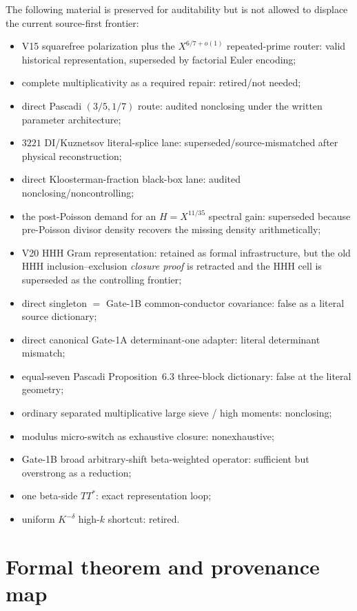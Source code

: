 \documentclass[11pt]{article}
\theoremstyle{definition}
\newcommand{\1}{\mathbf 1}
\begin{document}
The following material is preserved for auditability but is not allowed to displace the
current source-first frontier:
\begin{itemize}[leftmargin=1.6em]
\item V15 squarefree polarization plus the $X^{6/7+o(1)}$ repeated-prime router:
  valid historical representation, superseded by factorial Euler encoding;
\item complete multiplicativity as a required repair: retired/not needed;
\item direct Pascadi $(3/5,1/7)$ route: audited nonclosing under the written parameter
  architecture;
\item $3221$ DI/Kuznetsov literal-splice lane: superseded/source-mismatched after physical
  reconstruction;
\item direct Kloosterman-fraction black-box lane: audited nonclosing/noncontrolling;
\item the post-Poisson demand for an $H=X^{11/35}$ spectral gain: superseded because
  pre-Poisson divisor density recovers the missing density arithmetically;
\item V20 HHH Gram representation: retained as formal infrastructure, but the old HHH
  inclusion--exclusion \emph{closure proof} is retracted and the HHH cell is superseded as
  the controlling frontier;
\item direct singleton $=$ Gate-1B common-conductor covariance: false as a literal source
  dictionary;
\item direct canonical Gate-1A determinant-one adapter: literal determinant mismatch;
\item equal-seven Pascadi Proposition~6.3 three-block dictionary: false at the literal
  geometry;
\item ordinary separated multiplicative large sieve / high moments: nonclosing;
\item modulus micro-switch as exhaustive closure: nonexhaustive;
\item Gate-1B broad arbitrary-shift beta-weighted operator: sufficient but overstrong as a
  reduction;
\item one beta-side $TT^\ast$: exact representation loop;
\item uniform $K^{-\delta}$ high-$k$ shortcut: retired.
\end{itemize}


\section{Formal theorem and provenance map}
\end{document}
